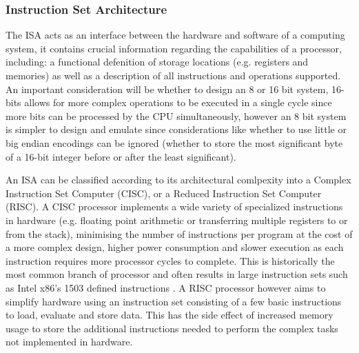 \subsubsection{Instruction Set Architecture}
\label{sec:ISA}
The ISA acts as an interface between the hardware and software of a computing system, it contains crucial information regarding the capabilities of a processor, including: a functional defenition of storage locations (e.g. registers and memories) as well as a description of all instructions and operations supported. An important consideration will be whether to design an 8 or 16 bit system, 16-bits allows for more complex operations to be executed in a single cycle since more bits can be processed by the CPU simultaneously, however an 8 bit system is simpler to design and emulate since considerations like whether to use little or big endian encodings can be ignored (whether to store the most significant byte of a 16-bit integer before or after the least significant).

An ISA can be classified according to its architectural comlpexity into a Complex Instruction Set Computer (CISC), or a Reduced Instruction Set Computer (RISC). A CISC processor implements a wide variety of specialized instructions in hardware (e.g. floating point arithmetic or transferring multiple registers to or from the stack), minimising the number of instructions per program at the cost of a more complex design, higher power consumption and slower execution as each instruction requires more processor cycles to complete. \textcite{gfg-risc-vs-cisc} This is historically the most common branch of processor and often results in large instruction sets such as Intel x86's 1503 defined instructions \textcite{ryg-blog}. A RISC processor however aims to simplify hardware using an instruction set consisting of a few basic instructions to load, evaluate and store data. This has the side effect of increased memory usage to store the additional instructions needed to perform the complex tasks not implemented in hardware.

